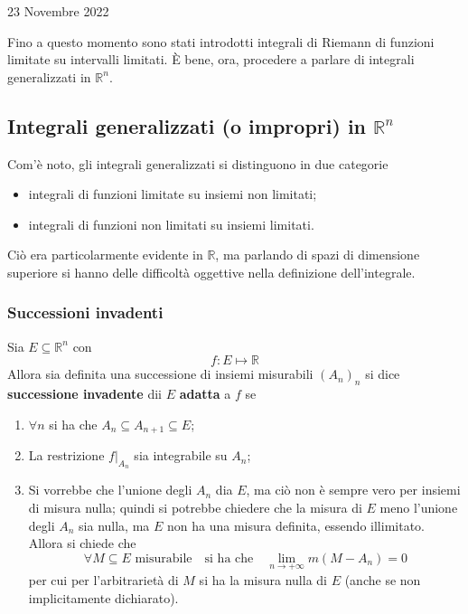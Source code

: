 \documentclass[a4paper]{extarticle}
\begin{document}
\newpage
\noindent
\begin{center}
    23 Novembre 2022
\end{center}
Fino a questo momento sono stati introdotti integrali di Riemann di funzioni limitate su intervalli limitati. È bene, ora, procedere a parlare di integrali generalizzati in $\mathbb{R}^n$.

\vspace{1em}
\subsection{Integrali generalizzati (o impropri) in $\mathbb{R}^n$}
Com'è noto, gli integrali generalizzati si distinguono in due categorie
\begin{itemize}
    \item integrali di funzioni limitate su insiemi non limitati;
    \item integrali di funzioni non limitati su insiemi limitati.
\end{itemize}
Ciò era particolarmente evidente in $\mathbb{R}$, ma parlando di spazi di dimensione superiore si hanno delle difficoltà oggettive nella definizione dell'integrale.

\vspace{1em}
\subsubsection{Successioni invadenti}
Sia $E \subseteq \mathbb{R}^n$ con
\[f : E \longmapsto \mathbb{R}\]
Allora sia definita una successione di insiemi misurabili $(A_n)_n$ si dice \textbf{successione invadente} dii $E$ \textbf{adatta} a $f$ se
\begin{enumerate}
    \item $\forall n$ si ha che $A_n \subseteq A_{n+1} \subseteq E$;
    \item La restrizione $f \vert_{A_n}$ sia integrabile su $A_n$;
    \item Si vorrebbe che l'unione degli $A_n$ dia $E$, ma ciò non è sempre vero per insiemi di misura nulla; quindi si potrebbe chiedere che la misura di $E$ meno l'unione degli $A_n$ sia nulla, ma $E$ non ha una misura definita, essendo illimitato. Allora si chiede che
    \[\forall M \subseteq E \text{ misurabile} \hspace{1em} \text{si ha che} \hspace{1em} \lim_{n \to +\infty} m \left(M-A_n\right)=0\]
    per cui per l'arbitrarietà di $M$ si ha la misura nulla di $E$ (anche se non implicitamente dichiarato).
\end{enumerate}
\end{document}
